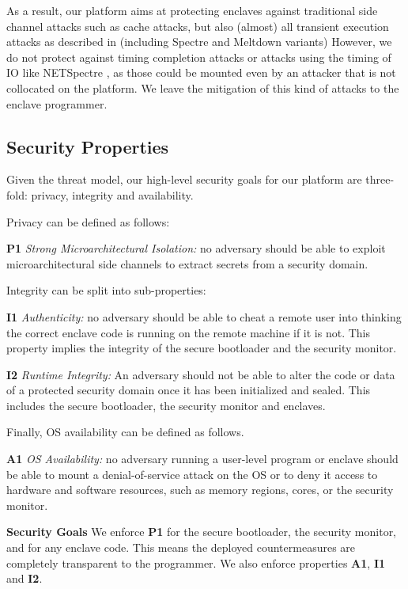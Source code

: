 As a result, our platform aims at protecting enclaves against traditional side channel attacks such as cache attacks, but also (almost) all transient execution attacks as described in \cite{canella2019systematic} (including Spectre \cite{Kocher2018spectre, van2018foreshadow, kiriansky2018speculative, chen2019sgxpectre, koruyeh2018spectre, maisuradze2018ret2spec}  and Meltdown \cite{Lipp2018meltdown, stecklina2018lazyfp, van2018foreshadow} variants) 
However, we do not protect against timing completion attacks or attacks using the timing of IO like NETSpectre \cite{schwarz2019netspectre}, as those could be mounted even by an attacker that is not collocated on the platform. 
We leave the mitigation of this kind of attacks to the enclave programmer.

\subsection{Security Properties}
Given the threat model, our high-level security goals for our platform are three-fold: privacy, integrity and availability.

Privacy can be defined as follows:

\noindent\textbf{P1} \emph{Strong Microarchitectural Isolation:} no adversary should be able to exploit microarchitectural side channels to extract secrets from a security domain.

Integrity can be split into sub-properties:

\noindent\textbf{I1} \emph{Authenticity:} no adversary should be able to cheat a remote user into thinking the correct enclave code is running on the remote machine if it is not.
This property implies the integrity of the secure bootloader and the security monitor.

\noindent\textbf{I2} \emph{Runtime Integrity:}
An adversary should not be able to alter the code or data  of a protected security domain once it has been initialized and sealed. This includes the secure bootloader, the security monitor and enclaves.

Finally, OS availability can be defined as follows.

\noindent\textbf{A1} \emph{OS Availability:}  no adversary running a user-level program or enclave should be able to mount a denial-of-service attack on the OS or to deny it access to hardware and software resources, such as memory regions, cores, or the security monitor.

\textbf{Security Goals}
We enforce \textbf{P1} for the secure bootloader, the security monitor, and for any enclave code.
This means the deployed countermeasures are completely transparent to the programmer.
We also enforce properties \textbf{A1}, \textbf{I1} and \textbf{I2}.


